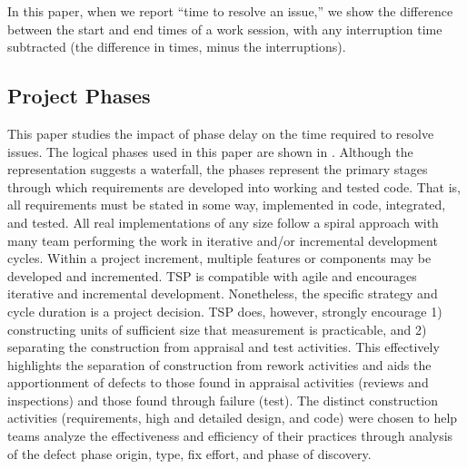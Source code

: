 In this paper, when we report ``time to resolve an
issue,'' we show the difference between the start and end times
of a work session, with any interruption time subtracted (the
difference in times, minus the interruptions). 


%
 
 

\subsection{Project Phases}
This paper studies the impact of phase delay on the time required to resolve issues.
The logical phases used in this paper are shown in . Although the representation suggests a waterfall, the phases represent the primary stages through which requirements are developed into working and tested code. That is, all requirements must be stated in some way, implemented in code, integrated, and tested. All real implementations of any size follow a spiral approach with many team performing the work in iterative and/or incremental development cycles.  Within a project increment, multiple features or components may be developed and incremented. TSP is compatible with agile and encourages iterative and incremental development. Nonetheless, the specific strategy and cycle duration is a project decision. TSP does, however, strongly encourage 1) constructing units of sufficient size that measurement is practicable, and 2) separating the construction from appraisal and test activities. This effectively highlights the separation of construction from rework activities and aids the apportionment of defects to those found in appraisal activities (reviews and inspections) and those found through failure (test). The distinct construction activities (requirements, high and detailed design, and code) were chosen to help teams analyze the effectiveness and efficiency of their practices through analysis of the defect phase origin, type, fix effort, and phase of discovery. 

